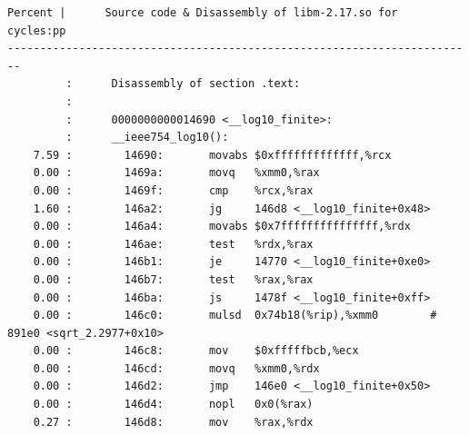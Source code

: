\documentclass[a4paper]{jpconf}
\begin{document}
\begin{appendices}
\begin{minipage}{\linewidth}
\begin{lstlisting}[language={[x64]Assembler}, basicstyle=\ttfamily\tiny,
caption=\_\_log10 finite cycles annotation]
Percent |      Source code & Disassembly of libm-2.17.so for  cycles:pp
------------------------------------------------------------------------
         :      Disassembly of section .text:
         :
         :      0000000000014690 <__log10_finite>:
         :      __ieee754_log10():
    7.59 :        14690:       movabs $0xfffffffffffff,%rcx
    0.00 :        1469a:       movq   %xmm0,%rax
    0.00 :        1469f:       cmp    %rcx,%rax
    1.60 :        146a2:       jg     146d8 <__log10_finite+0x48>
    0.00 :        146a4:       movabs $0x7fffffffffffffff,%rdx
    0.00 :        146ae:       test   %rdx,%rax
    0.00 :        146b1:       je     14770 <__log10_finite+0xe0>
    0.00 :        146b7:       test   %rax,%rax
    0.00 :        146ba:       js     1478f <__log10_finite+0xff>
    0.00 :        146c0:       mulsd  0x74b18(%rip),%xmm0        # 891e0 <sqrt_2.2977+0x10>
    0.00 :        146c8:       mov    $0xfffffbcb,%ecx
    0.00 :        146cd:       movq   %xmm0,%rdx
    0.00 :        146d2:       jmp    146e0 <__log10_finite+0x50>
    0.00 :        146d4:       nopl   0x0(%rax)
    0.27 :        146d8:       mov    %rax,%rdx
\end{lstlisting}
\end{minipage}


\end{appendices}
%
%
\end{document}
